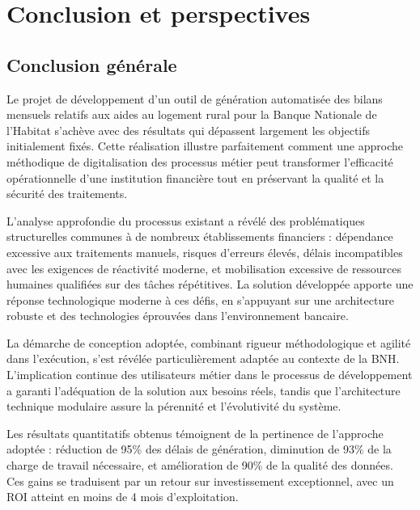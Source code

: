 \chapter*{Conclusion et perspectives}
\label{chap:conclusion}

\section*{Conclusion générale}

Le projet de développement d'un outil de génération automatisée des bilans mensuels relatifs aux aides au logement rural pour la Banque Nationale de l'Habitat s'achève avec des résultats qui dépassent largement les objectifs initialement fixés. Cette réalisation illustre parfaitement comment une approche méthodique de digitalisation des processus métier peut transformer l'efficacité opérationnelle d'une institution financière tout en préservant la qualité et la sécurité des traitements.

\medskip

L'analyse approfondie du processus existant a révélé des problématiques structurelles communes à de nombreux établissements financiers : dépendance excessive aux traitements manuels, risques d'erreurs élevés, délais incompatibles avec les exigences de réactivité moderne, et mobilisation excessive de ressources humaines qualifiées sur des tâches répétitives. La solution développée apporte une réponse technologique moderne à ces défis, en s'appuyant sur une architecture robuste et des technologies éprouvées dans l'environnement bancaire.

\medskip

La démarche de conception adoptée, combinant rigueur méthodologique et agilité dans l'exécution, s'est révélée particulièrement adaptée au contexte de la BNH. L'implication continue des utilisateurs métier dans le processus de développement a garanti l'adéquation de la solution aux besoins réels, tandis que l'architecture technique modulaire assure la pérennité et l'évolutivité du système.

\medskip

Les résultats quantitatifs obtenus témoignent de la pertinence de l'approche adoptée : réduction de 95\% des délais de génération, diminution de 93\% de la charge de travail nécessaire, et amélioration de 90\% de la qualité des données. Ces gains se traduisent par un retour sur investissement exceptionnel, avec un ROI atteint en moins de 4 mois d'exploitation.

